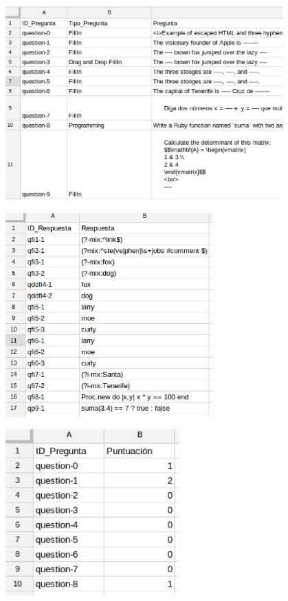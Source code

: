 \documentclass{beamer}
\begin{document}
\begin{frame}[allowframebreaks]
\begin{itemize}
    \framebreak
    
    \begin{center}
      \includegraphics[width=0.8\textwidth]{img/app3.eps}
    \end{center}
    \framebreak
    
    \begin{center}
      \includegraphics[width=0.6\textwidth]{img/app4.eps}
    \end{center}
    \framebreak
    
    \begin{center}
      \includegraphics[width=0.5\textwidth]{img/app5.eps}
    \end{center}
    \framebreak
    

\end{itemize}
\end{frame}
\end{document}
